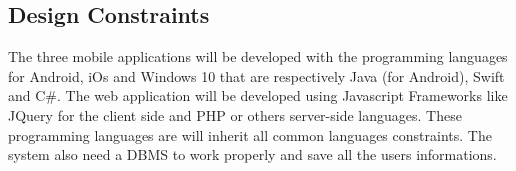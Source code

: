 \subsection{Design Constraints}
The three mobile applications will be developed with the programming languages for Android, iOs and Windows 10 that are respectively Java (for Android), Swift and C\#. The web application will be developed using Javascript Frameworks like JQuery for the client side and PHP or others server-side languages.
These programming languages are will inherit all common languages constraints.
The system also need a DBMS to work properly and save all the users informations.